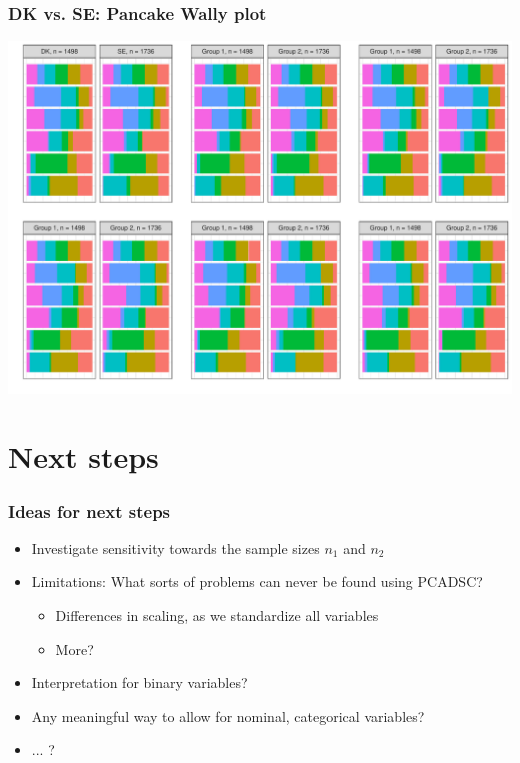\documentclass[a4]{beamer}
\begin{document}
\begin{frame}
\frametitle{DK vs. SE: Pancake Wally plot}
\includegraphics[scale = 0.4]{essDKSEWallyPCADSC.pdf}
\end{frame}

\section{Next steps}
\begin{frame}
\frametitle{Ideas for next steps}
\begin{itemize}
\item Investigate sensitivity towards the sample sizes $n_1$ and $n_2$
\item Limitations: What sorts of problems can never be found using PCADSC? 
\begin{itemize}
\item Differences in scaling, as we standardize all variables
\item More?
\end{itemize}
\item Interpretation for binary variables?
\item Any meaningful way to allow for nominal, categorical variables?
\item ... ?
\end{itemize}

\end{frame}
\end{document}
